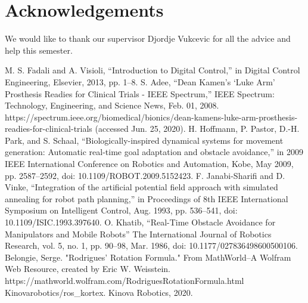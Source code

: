 \documentclass[a4paper, 10pt, conference]{ieeeconf}      %
\begin{document}






\section*{Acknowledgements}
We would like to thank our supervisor Djordje Vukcevic for all the advice and help this semester.



\begin{thebibliography}{99}

 M. S. Fadali and A. Visioli, “Introduction to Digital Control,” in Digital Control Engineering, Elsevier, 2013, pp. 1–8.
 S. Adee, “Dean Kamen’s ‘Luke Arm’ Prosthesis Readies for Clinical Trials - IEEE Spectrum,” IEEE Spectrum: Technology, Engineering, and Science News, Feb. 01, 2008. https://spectrum.ieee.org/biomedical/bionics/dean-kamens-luke-arm-prosthesis-readies-for-clinical-trials (accessed Jun. 25, 2020).
 H. Hoffmann, P. Pastor, D.-H. Park, and S. Schaal, “Biologically-inspired dynamical systems for movement generation: Automatic real-time goal adaptation and obstacle avoidance,” in 2009 IEEE International Conference on Robotics and Automation, Kobe, May 2009, pp. 2587–2592, doi: 10.1109/ROBOT.2009.5152423.
 F. Janabi-Sharifi and D. Vinke, “Integration of the artificial potential field approach with simulated annealing for robot path planning,” in Proceedings of 8th IEEE International Symposium on Intelligent Control, Aug. 1993, pp. 536–541, doi: 10.1109/ISIC.1993.397640.
 O. Khatib, “Real-Time Obstacle Avoidance for Manipulators and Mobile Robots” The International Journal of Robotics Research, vol. 5, no. 1, pp. 90–98, Mar. 1986, doi: 10.1177/027836498600500106.
  Belongie, Serge. "Rodrigues' Rotation Formula." From MathWorld--A Wolfram Web Resource, created by Eric W. Weisstein. https://mathworld.wolfram.com/RodriguesRotationFormula.html 
 Kinovarobotics/ros\_kortex. Kinova Robotics, 2020.




\end{thebibliography}
\end{document}
